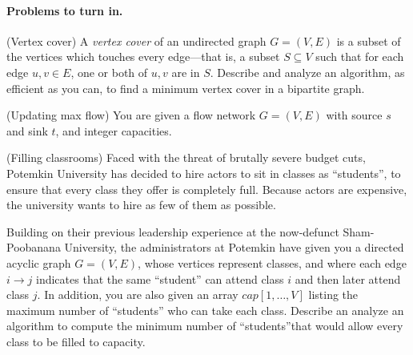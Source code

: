 \paragraph{Problems to turn in.}

\begin{questions}

\question[15] (Vertex cover) A \emph{vertex cover} of an undirected
  graph $G = (V, E)$ is a subset of the vertices which touches every
  edge—that is, a subset $S \subseteq V$ such that for each edge
  ${u,v} \in E$, one or both of $u,v$ are in $S$.  Describe and
  analyze an algorithm, as efficient as you can, to find a minimum
  vertex cover in a bipartite graph.

  \newpage

  \question (Updating max flow) You are given a flow network
  $G = (V,E)$ with source $s$ and sink $t$, and integer capacities.

  \newpage
  

  \question[15] (Filling classrooms) Faced with the threat of brutally
  severe budget cuts, Potemkin University has decided to hire actors
  to sit in classes as ``students'', to ensure that every class they
  offer is completely full. Because actors are expensive, the
  university wants to hire as few of them as possible.

  Building on their previous leadership experience at the now-defunct
  Sham-Poobanana University, the administrators at Potemkin have given
  you a directed acyclic graph $G = (V,E)$, whose vertices represent
  classes, and where each edge $i\to j$ indicates that the same
  ``student'' can attend class $i$ and then later attend class $j$. In
  addition, you are also given an array $cap[1,\ldots, V]$ listing the
  maximum number of ``students'' who can take each class. Describe an
  analyze an algorithm to compute the minimum number of
  ``students''that would allow every class to be filled to capacity.

\end{questions}

